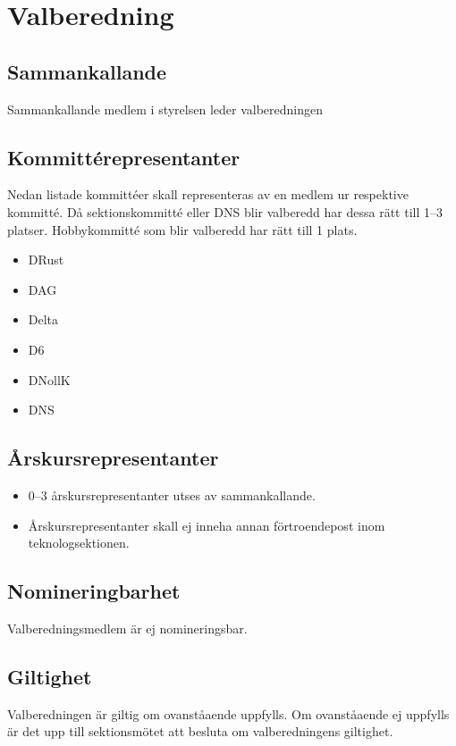 \section{Valberedning}
\subsection{Sammankallande}
Sammankallande medlem i styrelsen leder valberedningen
\subsection{Kommittérepresentanter}
Nedan listade kommittéer skall representeras av en medlem ur respektive kommitté. Då sektionskommitté eller DNS blir valberedd har dessa rätt till 1--3 platser. Hobbykommitté som blir valberedd har rätt till 1 plats. 
\begin{itemize}
  \item DRust
  \item DAG 
  \item Delta 
  \item D6 
  \item DNollK
  \item DNS
\end{itemize}
\subsection{Årskursrepresentanter}
\begin{itemize}
  \item 0--3 årskursrepresentanter utses av sammankallande. 
  \item Årskursrepresentanter skall ej inneha annan förtroendepost inom teknologsektionen. 
\end{itemize}
\subsection{Nomineringbarhet}
Valberedningsmedlem är ej nomineringsbar.
\subsection{Giltighet}
Valberedningen är giltig om ovanståaende uppfylls. Om ovanståaende ej uppfylls är det upp till sektionsmötet att besluta om valberedningens giltighet.
